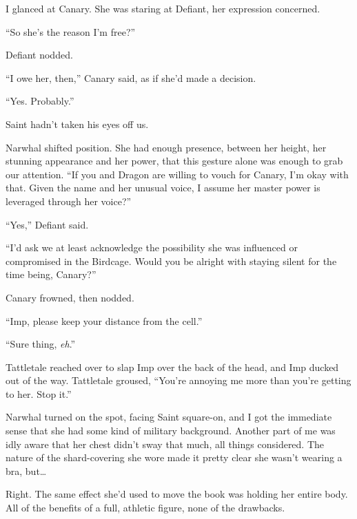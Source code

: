 I glanced at Canary.  She was staring at Defiant, her expression concerned.



``So she's the reason I'm free?''



Defiant nodded.



``I owe her, then,'' Canary said, as if she'd made a decision.



``Yes.  Probably.''



Saint hadn't taken his eyes off us.



Narwhal shifted position.  She had enough presence, between her height, her stunning appearance and her power, that this gesture alone was enough to grab our attention.  ``If you and Dragon are willing to vouch for Canary, I'm okay with that.  Given the name and her unusual voice, I assume her master power is leveraged through her voice?''



``Yes,'' Defiant said.



``I'd ask we at least acknowledge the possibility she was influenced or compromised in the Birdcage.  Would you be alright with staying silent for the time being, Canary?''



Canary frowned, then nodded.



``Imp, please keep your distance from the cell.''



``Sure thing, \emph{eh}.''



Tattletale reached over to slap Imp over the back of the head, and Imp ducked out of the way.  Tattletale groused, ``You're annoying me more than you're getting to her.  Stop it.''



Narwhal turned on the spot, facing Saint square-on, and I got the immediate sense that she had some kind of military background.  Another part of me was idly aware that her chest didn't sway that much, all things considered.  The nature of the shard-covering she wore made it pretty clear she wasn't wearing a bra, but\ldots



Right.  The same effect she'd used to move the book was holding her entire body.  All of the benefits of a full, athletic figure, none of the drawbacks.



